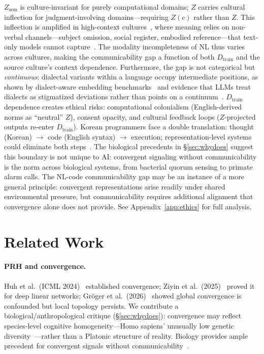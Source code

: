 \documentclass{article}
\theoremstyle{definition}
\newcommand{\Zsem}{Z_{\text{sem}}}
\newcommand{\Dtrain}{D_{\text{train}}}
\begin{document}
$\Zsem$ is culture-invariant for purely computational domains; $Z$ carries cultural inflection for judgment-involving domains---requiring $Z(c)$ rather than $Z$. This inflection is amplified in high-context cultures~\citep{hall1976beyond}, where meaning relies on non-verbal channels---subject omission, social register, embodied reference---that text-only models cannot capture~\citep{park2024pragmatic}. The modality incompleteness of NL thus varies across cultures, making the communicability gap a function of both $\Dtrain$ and the source culture's context dependence. Furthermore, the gap is not categorical but \emph{continuous}: dialectal variants within a language occupy intermediate positions, as shown by dialect-aware embedding benchmarks~\citep{faisal2025swan} and evidence that LLMs treat dialects as stigmatized deviations rather than points on a continuum~\citep{bui2025dialect}. $\Dtrain$ dependence creates ethical risks: computational colonialism (English-derived norms as ``neutral'' $Z$), consent opacity, and cultural feedback loops ($Z$-projected outputs re-enter $\Dtrain$). Korean programmers face a double translation: thought (Korean) $\to$ code (English syntax) $\to$ execution; representation-level systems could eliminate both steps~\citep{li2026reasoning}. The biological precedents in \S\ref{sec:whydoes} suggest this boundary is not unique to AI: convergent signaling without communicability is the norm across biological systems, from bacterial quorum sensing to primate alarm calls. The NL-code communicability gap may be an instance of a more general principle: convergent representations arise readily under shared environmental pressure, but communicability requires additional alignment that convergence alone does not provide. See Appendix~\ref{app:ethics} for full analysis.



\section{Related Work}\label{sec:related}

\paragraph{PRH and convergence.}
Huh et al.\ (ICML 2024)~\citep{huh2024platonic} established convergence; Ziyin et al.\ (2025)~\citep{ziyin2025proof} proved it for deep linear networks; Gr\"{o}ger et al.\ (2026)~\citep{groger2026aristotelian} showed global convergence is confounded but local topology persists. We contribute a biological/anthropological critique (\S\ref{sec:whydoes}): convergence may reflect species-level cognitive homogeneity---Homo sapiens' unusually low genetic diversity~\citep{pradomartinez2013apes,hu2023bottleneck}---rather than a Platonic structure of reality. Biology provides ample precedent for convergent signals without communicability~\citep{waters2005quorum,seyfarth1980vervet,magrath2015eavesdropping}.
\end{document}

